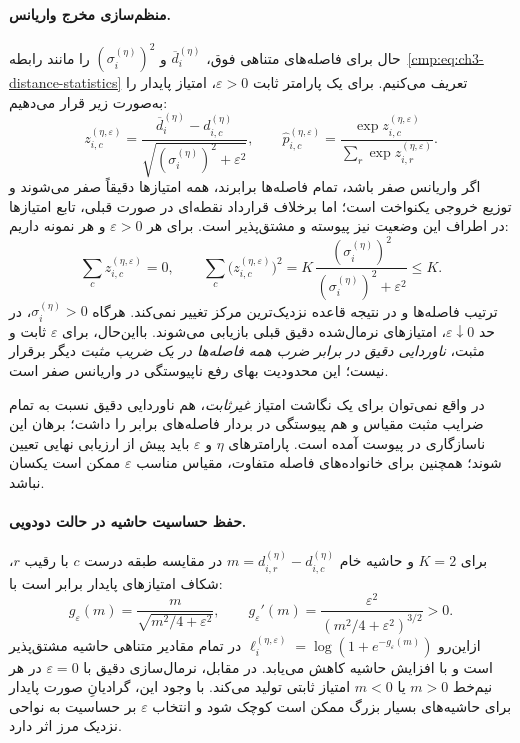 \paragraph{منظم‌سازی مخرج واریانس.}
حال برای فاصله‌های متناهی فوق،
$\overline d_i^{(\eta)}$ و
$(\sigma_i^{(\eta)})^2$
را مانند رابطه~\eqref{cmp:eq:ch3-distance-statistics}
تعریف می‌کنیم. برای یک پارامتر ثابت
$\varepsilon>0$، امتیاز پایدار را
به‌صورت زیر قرار می‌دهیم:
\begin{equation}\label{cmp:eq:ch3-stable-normalized-score}
\boxed{
z_{i,c}^{(\eta,\varepsilon)}
=\frac{\overline d_i^{(\eta)}-d_{i,c}^{(\eta)}}
{\sqrt{(\sigma_i^{(\eta)})^2+\varepsilon^2}},
\qquad
\widehat p_{i,c}^{(\eta,\varepsilon)}
=\frac{\exp z_{i,c}^{(\eta,\varepsilon)}}
{\sum_r\exp z_{i,r}^{(\eta,\varepsilon)}}.
}
\end{equation}
اگر واریانس صفر باشد، تمام فاصله‌ها
برابرند، همه امتیازها دقیقاً صفر می‌شوند
و توزیع خروجی یکنواخت است؛
اما برخلاف قرارداد نقطه‌ای
در صورت قبلی، تابع امتیازها
در اطراف این وضعیت نیز پیوسته و
مشتق‌پذیر است. برای هر $\varepsilon>0$
و هر نمونه داریم:
\[
\sum_cz_{i,c}^{(\eta,\varepsilon)}=0,
\qquad
\sum_c\bigl(z_{i,c}^{(\eta,\varepsilon)}\bigr)^2
=K\,\frac{(\sigma_i^{(\eta)})^2}
{(\sigma_i^{(\eta)})^2+\varepsilon^2}\le K.
\]
ترتیب فاصله‌ها و در نتیجه
قاعده نزدیک‌ترین مرکز تغییر نمی‌کند.
هرگاه $\sigma_i^{(\eta)}>0$،
در حد $\varepsilon\downarrow0$،
امتیازهای نرمال‌شده دقیق قبلی
بازیابی می‌شوند. بااین‌حال،
برای $\varepsilon$ ثابت و مثبت،
\emph{ناوردایی دقیق در برابر ضرب همه
فاصله‌ها در یک ضریب مثبت}
دیگر برقرار نیست؛ این محدودیت
بهای رفع ناپیوستگی در واریانس صفر است.

در واقع نمی‌توان برای یک نگاشت امتیاز
\emph{غیرثابت}، هم ناوردایی دقیق نسبت
به تمام ضرایب مثبت مقیاس و هم
پیوستگی در بردار فاصله‌های برابر را
داشت؛ برهان این ناسازگاری در پیوست آمده است.
پارامترهای $\eta$ و $\varepsilon$
باید پیش از ارزیابی نهایی تعیین شوند؛
همچنین برای خانواده‌های فاصله متفاوت،
مقیاس مناسب $\varepsilon$ ممکن است
یکسان نباشد.


\paragraph{حفظ حساسیت حاشیه در حالت دودویی.}
برای $K=2$ و حاشیه خام
$m=d_{i,r}^{(\eta)}-d_{i,c}^{(\eta)}$
در مقایسه طبقه درست $c$ با رقیب $r$،
شکاف امتیازهای پایدار برابر است با:
\begin{equation}\label{cmp:eq:ch3-stable-binary-margin}
g_\varepsilon(m)
=\frac{m}{\sqrt{m^2/4+\varepsilon^2}},
\qquad
g_\varepsilon'(m)
=\frac{\varepsilon^2}
{(m^2/4+\varepsilon^2)^{3/2}}>0.
\end{equation}
ازاین‌رو
$\ell_i^{(\eta,\varepsilon)}
=\log(1+e^{-g_\varepsilon(m)})$
در تمام مقادیر متناهی حاشیه مشتق‌پذیر
است و با افزایش حاشیه کاهش می‌یابد.
در مقابل، نرمال‌سازی دقیق با
$\varepsilon=0$ در هر نیم‌خط
$m>0$ یا $m<0$ امتیاز ثابتی تولید
می‌کند. با وجود این، گرادیانِ
صورت پایدار برای حاشیه‌های
بسیار بزرگ ممکن است کوچک شود
و انتخاب $\varepsilon$ بر
حساسیت به نواحی نزدیک مرز اثر دارد.

